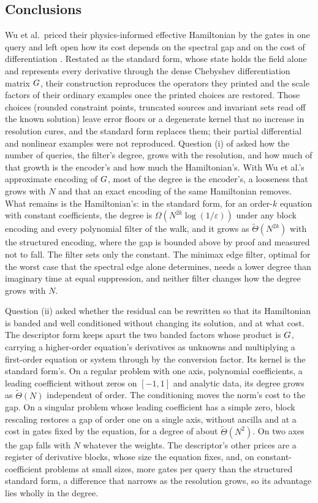 \subsection{Conclusions}
\label{sec:conclusions-answers}

Wu et al.\ priced their physics-informed effective Hamiltonian by the gates in one query and left open how its cost depends on the spectral gap and on the cost of differentiation \cite{wu2025pihm}. Restated as the standard form, whose state holds the field alone and represents every derivative through the dense Chebyshev differentiation matrix $G$, their construction reproduces the operators they printed and the scale factors of their ordinary examples once the printed choices are restored. Those choices (rounded constraint points, truncated sources and invariant sets read off the known solution) leave error floors or a degenerate kernel that no increase in resolution cures, and the standard form replaces them; their partial differential and nonlinear examples were not reproduced. Question (i) of  asked how the number of queries, the filter's degree, grows with the resolution, and how much of that growth is the encoder's and how much the Hamiltonian's. With Wu et al.'s approximate encoding of $G$, most of the degree is the encoder's, a looseness that grows with $N$ and that an exact encoding of the same Hamiltonian removes. What remains is the Hamiltonian's: in the standard form, for an order-$k$ equation with constant coefficients, the degree is $\Omega(N^{2k}\log(1/\varepsilon))$ under any block encoding and every polynomial filter of the walk, and it grows as $\tilde\Theta(N^{2k})$ with the structured encoding, where the gap is bounded above by proof and measured not to fall. The filter sets only the constant. The minimax edge filter, optimal for the worst case that the spectral edge alone determines, needs a lower degree than imaginary time at equal suppression, and neither filter changes how the degree grows with $N$.

Question (ii) asked whether the residual can be rewritten so that its Hamiltonian is banded and well conditioned without changing its solution, and at what cost. The descriptor form keeps apart the two banded factors whose product is $G$, carrying a higher-order equation's derivatives as unknowns and multiplying a first-order equation or system through by the conversion factor. Its kernel is the standard form's. On a regular problem with one axis, polynomial coefficients, a leading coefficient without zeros on $[-1,1]$ and analytic data, its degree grows as $\tilde\Theta(N)$ independent of order. The conditioning moves the norm's cost to the gap. On a singular problem whose leading coefficient has a simple zero, block rescaling restores a gap of order one on a single axis, without ancilla and at a cost in gates fixed by the equation, for a degree of about $\tilde\Theta(N^2)$. On two axes the gap falls with $N$ whatever the weights. The descriptor's other prices are a register of derivative blocks, whose size the equation fixes, and, on constant-coefficient problems at small sizes, more gates per query than the structured standard form, a difference that narrows as the resolution grows, so its advantage lies wholly in the degree.

